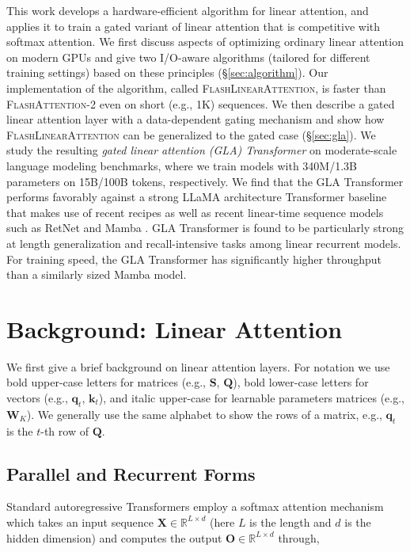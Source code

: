 This work develops a hardware-efficient algorithm for linear attention, and applies it to train a gated variant of linear attention that is competitive with softmax attention. We first discuss  aspects of optimizing ordinary linear attention on modern GPUs  and give two I/O-aware algorithms (tailored for different training settings) based on these principles (\S\ref{sec:algorithm}). Our implementation of the algorithm, called \textsc{FlashLinearAttention}, is faster than \textsc{FlashAttention-2} \citep{flashattention2} even on short (e.g., 1K) sequences. We then describe a gated linear attention layer with a data-dependent gating mechanism and show how \textsc{FlashLinearAttention} can be generalized to the gated case (\S\ref{sec:gla}). 
We study the resulting \emph{gated linear attention (GLA) Transformer} on moderate-scale language modeling benchmarks, where we train models with 340M/1.3B parameters on 15B/100B tokens, respectively. We find that the GLA Transformer performs favorably against a strong LLaMA architecture Transformer baseline that makes use of recent recipes \citep[Transformer++;][]{touvron2023llama} as well as recent linear-time sequence models such as RetNet \cite{sun2023retentive} and Mamba \citep{Gu2023MambaLS}. GLA Transformer is found to be particularly strong at length generalization and recall-intensive tasks among linear recurrent models. For training speed,  the GLA Transformer has significantly  higher throughput than a similarly sized Mamba model.

\section{Background: Linear Attention}

We first give a brief background on linear attention layers. For notation we  use bold upper-case letters for matrices (e.g., ${\mathbf{S}}$, ${\mathbf{Q}}$),  bold lower-case letters  for vectors (e.g., ${\bm{q}}_t$, ${\bm{k}}_t$), and italic upper-case  for learnable parameters matrices (e.g., ${\bm{W}}_K$). We generally use the same alphabet to show the rows of a matrix, e.g., ${\bm{q}}_t$ is the $t$-th row of ${\mathbf{Q}}$.

\label{sec:background}

\subsection{Parallel and Recurrent Forms}

\label{subsec:background-lin}
Standard autoregressive Transformers employ a softmax attention mechanism which takes an input sequence ${\mathbf{X}} \in \mathbb{R}^{L \times d}$ (here $L$ is the length and $d$ is the hidden dimension) and computes the output ${\mathbf{O}} \in \mathbb{R}^{L \times d}$ through,

